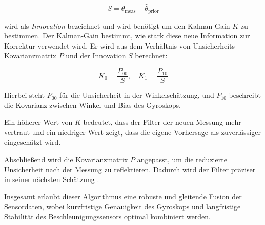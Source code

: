 \begin{equation*}
S = \theta_{\text{meas}} - \hat{\theta}_{\text{prior}}
\end{equation*}

wird als \emph{Innovation} bezeichnet und wird benötigt um den Kalman-Gain $K$ zu bestimmen. Der Kalman-Gain bestimmt, wie stark diese neue Information zur Korrektur verwendet wird. Er wird aus dem Verhältnis von Unsicherheits-Kovarianzmatrix $P$ und der Innovation $S$ berechnet:

\begin{equation*}
K_0 = \frac{P_{00}}{S}, \quad K_1 = \frac{P_{10}}{S}
\end{equation*}

Hierbei steht $P_{00}$ für die Unsicherheit in der Winkelschätzung, und $P_{10}$ beschreibt die Kovarianz zwischen Winkel und Bias des Gyroskops.

Ein höherer Wert von $K$ bedeutet, dass der Filter der neuen Messung mehr vertraut und ein niedriger Wert zeigt, dass die eigene Vorhersage als zuverlässiger eingeschätzt wird.

Abschließend wird die Kovarianzmatrix $P$ angepasst, um die reduzierte Unsicherheit nach der Messung zu reflektieren. Dadurch wird der Filter präziser in seiner nächsten Schätzung \cite{raspberry_tkjelectronics_kalman_filter_2012}.

Insgesamt erlaubt dieser Algorithmus eine robuste und gleitende Fusion der Sensordaten, wobei kurzfristige Genauigkeit des Gyroskops und langfristige Stabilität des Beschleunigungssensors optimal kombiniert werden.

